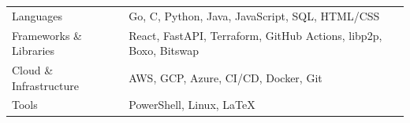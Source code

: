 \documentclass[a4paper,12pt]{article}
\begin{document}
\begin{tabularx}{\linewidth}{@{}l X@{}}

Languages &
Go, C, Python, Java, JavaScript, SQL, HTML/CSS
\\

Frameworks \& Libraries &
React, FastAPI, Terraform, GitHub Actions, libp2p, Boxo, Bitswap
\\

Cloud \& Infrastructure &
AWS, GCP, Azure, CI/CD, Docker, Git
\\

Tools &
PowerShell, Linux, LaTeX
\\

\end{tabularx}
\end{document}
